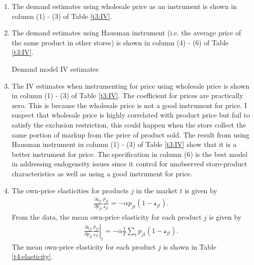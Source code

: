 \documentclass{article}
\begin{document}
\begin{enumerate}
\begin{table}[H]
\centering
\begin{threeparttable}
\caption{Demand model OLS estimates}\label{t2:OLS}

\end{threeparttable}
\end{table}

\item The demand estimates using wholesale price as an instrument is shown in column (1) - (3) of Table \ref{t3:IV}.
\item The demand estimates using Hausman instrument (i.e. the average price of the same product in other
stores) is shown in column (4) - (6) of Table \ref{t3:IV}.

\begin{table}[H]
\centering
\begin{threeparttable}
\caption{Demand model IV estimates}\label{t3:IV}

\end{threeparttable}
\end{table}

\item The IV estimates when instrumenting for price using wholesale price is shown in column (1) - (3) of Table \ref{t3:IV}. The coefficient for prices are practically zero. This is because the wholesale price is not a good instrument for price. I suspect that wholesale price is highly correlated with product price but fail to satisfy the exclusion restriction, this could happen when the store collect the same portion of markup from the price of product sold. The result from using Hausman instrument in column (1) - (3) of Table \ref{t3:IV} show that it is a better instrument for price. The specification in column (6) is the best model in addressing endogeneity issues since it control for unobserved store-product characteristics as well as using a good instrument for price.

\item The own-price elasticities for products $j$ in the market $t$ is given by
\begin{align*}
    \frac{\partial\mathcal{s}_{jt}}{\partial p_{jt}}\frac{p_{jt}}{\mathcal{s}_{jt}}=-\alpha p_{jt}(1-\mathcal{s}_{jt}).
\end{align*}
From the data, the mean own-price elasticity for each product $j$ is given by
\begin{align*}
    \left.\frac{\partial\mathcal{s}_{jt}}{\partial p_{jt}}\frac{p_{jt}}{\mathcal{s}_{jt}}\right\vert_t=-\alpha \frac{1}{T}\sum_{t}p_{jt}(1-\mathcal{s}_{jt}).
\end{align*}
The mean own-price elasticity for each product $j$ is shown in Table \ref{t4:elasticity}.


\end{enumerate}
\end{document}
